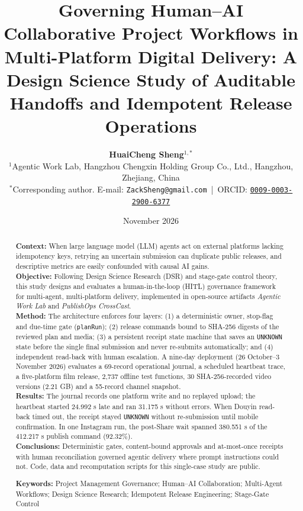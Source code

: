 \documentclass[11pt,a4paper]{article}
\title{\textbf{Governing Human--AI Collaborative Project Workflows in Multi-Platform Digital Delivery: A Design Science Study of Auditable Handoffs and Idempotent Release Operations}}
\author{
  \textbf{HuaiCheng Sheng}$^{1,*}$ \\
  \small $^{1}$Agentic Work Lab, Hangzhou Chengxin Holding Group Co., Ltd., Hangzhou, Zhejiang, China \\
  \small $^{*}$Corresponding author. E-mail: \texttt{ZackSheng@gmail.com} \,|\, ORCID: \href{https://orcid.org/0009-0003-2900-6377}{\texttt{0009-0003-2900-6377}}
}
\date{November 2026}
\theoremstyle{definition}
\begin{document}
\maketitle

\begin{abstract}
\noindent
\textbf{Context:} When large language model (LLM) agents act on external platforms lacking idempotency keys, retrying an uncertain submission can duplicate public releases, and descriptive metrics are easily confounded with causal AI gains. \\
\textbf{Objective:} Following Design Science Research (DSR) and stage-gate control theory, this study designs and evaluates a human-in-the-loop (HITL) governance framework for multi-agent, multi-platform delivery, implemented in open-source artifacts \emph{Agentic Work Lab} and \emph{PublishOps CrossCast}. \\
\textbf{Method:} The architecture enforces four layers: (1) a deterministic owner, stop-flag and due-time gate (\texttt{planRun}); (2) release commands bound to SHA-256 digests of the reviewed plan and media; (3) a persistent receipt state machine that saves an \texttt{UNKNOWN} state before the single final submission and never re-submits automatically; and (4) independent read-back with human escalation. A nine-day deployment (26 October--3 November 2026) evaluates a 69-record operational journal, a scheduled heartbeat trace, a five-platform film release, 2,737 offline test functions, 30 SHA-256-recorded video versions (2.21 GB) and a 55-record channel snapshot. \\
\textbf{Results:} The journal records one platform write and no replayed upload; the heartbeat started 24.992 s late and ran 31.175 s without errors. When Douyin read-back timed out, the receipt stayed \texttt{UNKNOWN} without re-submission until mobile confirmation. In one Instagram run, the post-Share wait spanned 380.551 s of the 412.217 s publish command (92.32\%). \\
\textbf{Conclusions:} Deterministic gates, content-bound approvals and at-most-once receipts with human reconciliation governed agentic delivery where prompt instructions could not. Code, data and recomputation scripts for this single-case study are public.

\vspace{0.5em}
\noindent
\textbf{Keywords:} Project Management Governance; Human--AI Collaboration; Multi-Agent Workflows; Design Science Research; Idempotent Release Engineering; Stage-Gate Control
\end{abstract}
\end{document}
